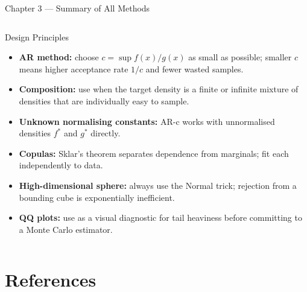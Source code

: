 \documentclass[aspectratio=169,10pt]{beamer}
\begin{document}
\begin{frame}[allowframebreaks]{Chapter 3 --- Summary of All Methods}
\begin{columns}
    \begin{block}{Design Principles}
      \begin{itemize}
        \item \textbf{AR method:} choose $c = \sup f(x)/g(x)$ as small as
              possible; smaller $c$ means higher acceptance rate $1/c$ and
              fewer wasted samples.
        \item \textbf{Composition:} use when the target density is a finite or
              infinite mixture of densities that are individually easy to sample.
        \item \textbf{Unknown normalising constants:} AR-c works with
              unnormalised densities $f^*$ and $g^*$ directly.
        \item \textbf{Copulas:} Sklar's theorem separates dependence from
              marginals; fit each independently to data.
        \item \textbf{High-dimensional sphere:} always use the Normal trick;
              rejection from a bounding cube is exponentially inefficient.
        \item \textbf{QQ plots:} use as a visual diagnostic for tail heaviness
              before committing to a Monte Carlo estimator.
      \end{itemize}
    \end{block}
  \end{columns}

\end{frame}

\section*{References}
\end{document}
